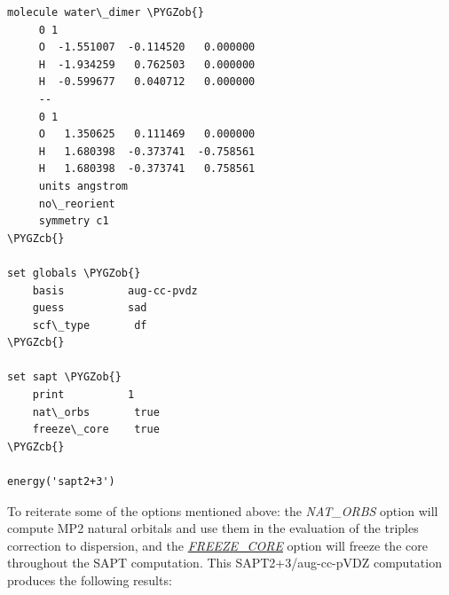 \documentclass[letterpaper,10pt,english]{sphinxmanual}
\def\PYGZob{\char`\{}
\def\PYGZcb{\char`\}}
\begin{document}
\begin{Verbatim}[commandchars=\\\{\}]
molecule water\_dimer \PYGZob{}
     0 1
     O  -1.551007  -0.114520   0.000000
     H  -1.934259   0.762503   0.000000
     H  -0.599677   0.040712   0.000000
     --
     0 1
     O   1.350625   0.111469   0.000000
     H   1.680398  -0.373741  -0.758561
     H   1.680398  -0.373741   0.758561
     units angstrom
     no\_reorient
     symmetry c1
\PYGZcb{}

set globals \PYGZob{}
    basis          aug-cc-pvdz
    guess          sad
    scf\_type       df
\PYGZcb{}

set sapt \PYGZob{}
    print          1
    nat\_orbs       true
    freeze\_core    true
\PYGZcb{}

energy('sapt2+3')
\end{Verbatim}

To reiterate some of the options mentioned above: the
\emph{NAT\_ORBS} option will compute MP2 natural orbitals and use
them in the evaluation of the triples correction to dispersion, and the
{\hyperref[index:term-29]{\emph{FREEZE\_CORE}}} option will freeze the core throughout the SAPT
computation. This SAPT2+3/aug-cc-pVDZ computation produces the following
results:
\end{document}
